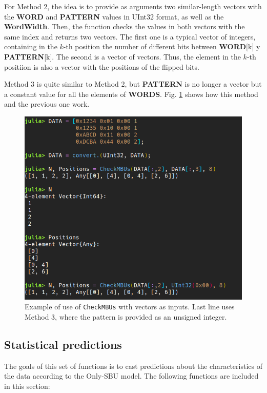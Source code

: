 \begin{itemize}
	For Method 2, the idea is to provide as arguments two similar-length vectors with the \textbf{WORD} and \textbf{PATTERN} values in UInt32 format, as well as the \textbf{WordWidth}. Then, the function checks the values in both vectors with the same index and returns two vectors. The first one is a typical vector of integers, containing in the \(k\)-th position the number of different bits between \textbf{WORD}[k] y \textbf{PATTERN}[k]. The second is a vector of vectors. Thus, the element in the \(k\)-th positiion is also a vector with the positions of the flipped bits. 
	
	Method 3 is quite similar to Method 2, but \textbf{PATTERN} is no longer a vector but a constant value for all the elements of \textbf{WORDS}. Fig. \ref{fig:Example_CheckMBUs_M23} shows how this method and the previous one work.
	
	\begin{figure}[h!]
		\centering
		\includegraphics[width=0.75\columnwidth]{fig/functions/CheckMBUs_Methods2_3.png}
		\caption{Example of use of \texttt{CheckMBUs} with vectors as inputs. Last line uses Method 3, where the pattern is provided as an unsigned integer.}
		\label{fig:Example_CheckMBUs_M23}
	\end{figure}
	
\end{itemize}
%
\subsection{Statistical predictions}\label{Subsec:StatisticalPredictions}
%
The goals of this set of functions is to cast predictions about the characteristics of the data according to the Only-SBU model. The following functions are included in this section:

